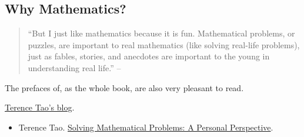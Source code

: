 \documentclass{article}
\numberwithin{equation}{section}
\begin{document}
\subsection{Why Mathematics?}
\begin{quotation}
	``But I just like mathematics because it is fun. Mathematical problems, or puzzles, are important to real mathematics (like solving real-life problems), just as fables, stories, and anecdotes are important to the young in understanding real life.'' -- \cite[Preface, p. viii]{Tao2006}
\end{quotation}
The prefaces of, as the whole book, \cite{Tao2006} are also very pleasant to read.


\begin{thebibliography}{99}
	 \href{https://terrytao.wordpress.com}{Terence Tao's blog}.
	\begin{itemize}
		\item Terence Tao. \href{https://terrytao.wordpress.com/books/solving-mathematical-problems-a-personal-perspective/}{Solving Mathematical Problems: A Personal Perspective}.
	\end{itemize}
\end{thebibliography}

\printbibliography[heading=bibintoc]
\end{document}
